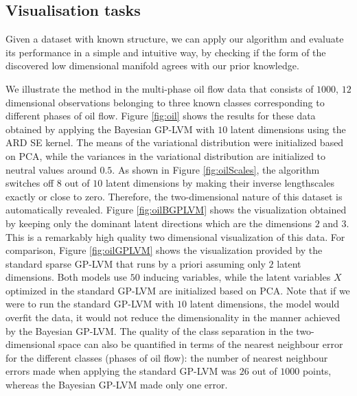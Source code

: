 \subsection{Visualisation tasks}

Given a dataset with known structure, we can apply our algorithm and evaluate its performance in a simple and intuitive
way, by checking if the form of the discovered low dimensional manifold agrees with our prior knowledge.
\par
We
illustrate the method in the multi-phase oil
flow data \cite{Bishop:oil93} that consists of $1000$, $12$ 
dimensional observations belonging to three known classes
corresponding to different phases of oil flow.   
Figure \ref{fig:oil} shows the results for these  data obtained
by applying the Bayesian GP-LVM with $10$ latent dimensions using the ARD SE
kernel. The means of the variational distribution were initialized
based on PCA, while the variances in the variational distribution are 
initialized to neutral values around $0.5$. As shown in Figure
\ref{fig:oilScales}, the algorithm switches
off $8$ out of $10$ latent dimensions by making their 
inverse lengthscales exactly or close to zero. Therefore, the
two-dimensional nature of this dataset is automatically revealed. Figure \ref{fig:oilBGPLVM} shows the
visualization obtained by keeping only the 
dominant latent directions 
which are the dimensions $2$ and $3$. This is a remarkably high quality two
dimensional visualization of this data. For comparison, Figure
\ref{fig:oilGPLVM} shows the visualization provided by the standard sparse
GP-LVM that runs by a priori assuming only $2$ latent dimensions. 
Both models use $50$ inducing variables, while the latent variables
$X$ optimized in the standard GP-LVM are initialized based on PCA. 
Note that if we were to run the standard GP-LVM with $10$ latent 
dimensions, the model would overfit the data, it would not reduce the 
dimensionality in the manner achieved by the Bayesian GP-LVM. 
The quality of the class separation in the two-dimensional space
can also be quantified in terms of the nearest neighbour error for the different
classes (phases of oil flow): the number of nearest neighbour errors made when applying
the standard GP-LVM was $26$ out of $1000$ points, whereas the Bayesian GP-LVM made only one error.


